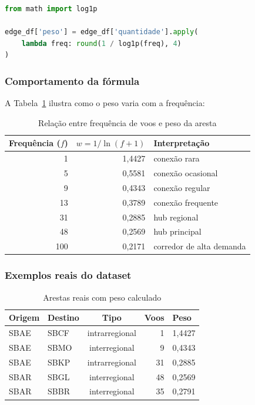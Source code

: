 \documentclass[12pt,a4paper]{article}
\begin{document}
\begin{lstlisting}[language=Python]
from math import log1p

edge_df['peso'] = edge_df['quantidade'].apply(
    lambda freq: round(1 / log1p(freq), 4)
)
\end{lstlisting}

\subsubsection{Comportamento da fórmula}

A Tabela~\ref{tab:pesos} ilustra como o peso varia com a frequência:

\begin{table}[H]
\centering
\caption{Relação entre frequência de voos e peso da aresta}
\label{tab:pesos}
\begin{tabular}{rrl}
\toprule
\textbf{Frequência ($f$)} & \textbf{$w = 1/\ln(f+1)$} & \textbf{Interpretação} \\
\midrule
1   & 1{,}4427 & conexão rara \\
5   & 0{,}5581 & conexão ocasional \\
9   & 0{,}4343 & conexão regular \\
13  & 0{,}3789 & conexão frequente \\
31  & 0{,}2885 & hub regional \\
48  & 0{,}2569 & hub principal \\
100 & 0{,}2171 & corredor de alta demanda \\
\bottomrule
\end{tabular}
\end{table}

\subsubsection{Exemplos reais do dataset}

\begin{table}[H]
\centering
\caption{Arestas reais com peso calculado}
\begin{tabular}{llcrl}
\toprule
\textbf{Origem} & \textbf{Destino} & \textbf{Tipo} & \textbf{Voos} & \textbf{Peso} \\
\midrule
SBAE & SBCF & intrarregional & 1  & 1{,}4427 \\
SBAE & SBMO & interregional  & 9  & 0{,}4343 \\
SBAE & SBKP & intrarregional & 31 & 0{,}2885 \\
SBAR & SBGL & interregional  & 48 & 0{,}2569 \\
SBAR & SBBR & interregional  & 35 & 0{,}2791 \\
\bottomrule
\end{tabular}
\end{table}
\end{document}
